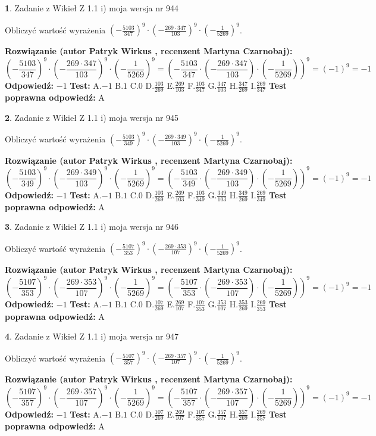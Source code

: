 \documentclass[12pt, a4paper]{article}
\theoremstyle{definition} %
\newtheorem{zad}{}
\newcommand{\zadStart}[1]{\begin{zad}#1\newline}
\newcommand{\zadStop}{\end{zad}}
\newcommand{\rozwStart}[2]{\noindent \textbf{Rozwiązanie (autor #1 , recenzent #2): }\newline}
\newcommand{\rozwStop}{\newline}
\newcommand{\odpStart}{\noindent \textbf{Odpowiedź:}\newline}
\newcommand{\odpStop}{\newline}
\newcommand{\testStart}{\noindent \textbf{Test:}\newline}
\newcommand{\testStop}{\newline}
\newcommand{\kluczStart}{\noindent \textbf{Test poprawna odpowiedź:}\newline}
\newcommand{\kluczStop}{\newline}
\begin{document}
\zadStart{Zadanie z Wikieł Z 1.1 i) moja wersja nr 944}

Obliczyć wartość wyrażenia $(-\frac{5103}{347})^{9} \cdot (-\frac{269 \cdot 347}{103})^{9} \cdot (-\frac{1}{5269})^{9}$.
\zadStop
\rozwStart{Patryk Wirkus}{Martyna Czarnobaj}
$$(-\frac{5103}{347})^{9} \cdot (-\frac{269 \cdot 347}{103})^{9} \cdot (-\frac{1}{5269})^{9} = (-\frac{5103}{347} \cdot (-\frac{269 \cdot 347}{103}) \cdot (-\frac{1}{5269}))^{9} = (-1)^{9} = -1$$
\rozwStop
\odpStart
$-1$
\odpStop
\testStart
A.$-1$ B.$1$ C.$0$ D.$\frac{103}{269}$ E.$\frac{269}{103}$
F.$\frac{103}{347}$ G.$\frac{347}{103}$
H.$\frac{347}{269}$
I.$\frac{269}{347}$
\testStop
\kluczStart
A
\kluczStop



\zadStart{Zadanie z Wikieł Z 1.1 i) moja wersja nr 945}

Obliczyć wartość wyrażenia $(-\frac{5103}{349})^{9} \cdot (-\frac{269 \cdot 349}{103})^{9} \cdot (-\frac{1}{5269})^{9}$.
\zadStop
\rozwStart{Patryk Wirkus}{Martyna Czarnobaj}
$$(-\frac{5103}{349})^{9} \cdot (-\frac{269 \cdot 349}{103})^{9} \cdot (-\frac{1}{5269})^{9} = (-\frac{5103}{349} \cdot (-\frac{269 \cdot 349}{103}) \cdot (-\frac{1}{5269}))^{9} = (-1)^{9} = -1$$
\rozwStop
\odpStart
$-1$
\odpStop
\testStart
A.$-1$ B.$1$ C.$0$ D.$\frac{103}{269}$ E.$\frac{269}{103}$
F.$\frac{103}{349}$ G.$\frac{349}{103}$
H.$\frac{349}{269}$
I.$\frac{269}{349}$
\testStop
\kluczStart
A
\kluczStop



\zadStart{Zadanie z Wikieł Z 1.1 i) moja wersja nr 946}

Obliczyć wartość wyrażenia $(-\frac{5107}{353})^{9} \cdot (-\frac{269 \cdot 353}{107})^{9} \cdot (-\frac{1}{5269})^{9}$.
\zadStop
\rozwStart{Patryk Wirkus}{Martyna Czarnobaj}
$$(-\frac{5107}{353})^{9} \cdot (-\frac{269 \cdot 353}{107})^{9} \cdot (-\frac{1}{5269})^{9} = (-\frac{5107}{353} \cdot (-\frac{269 \cdot 353}{107}) \cdot (-\frac{1}{5269}))^{9} = (-1)^{9} = -1$$
\rozwStop
\odpStart
$-1$
\odpStop
\testStart
A.$-1$ B.$1$ C.$0$ D.$\frac{107}{269}$ E.$\frac{269}{107}$
F.$\frac{107}{353}$ G.$\frac{353}{107}$
H.$\frac{353}{269}$
I.$\frac{269}{353}$
\testStop
\kluczStart
A
\kluczStop



\zadStart{Zadanie z Wikieł Z 1.1 i) moja wersja nr 947}

Obliczyć wartość wyrażenia $(-\frac{5107}{357})^{9} \cdot (-\frac{269 \cdot 357}{107})^{9} \cdot (-\frac{1}{5269})^{9}$.
\zadStop
\rozwStart{Patryk Wirkus}{Martyna Czarnobaj}
$$(-\frac{5107}{357})^{9} \cdot (-\frac{269 \cdot 357}{107})^{9} \cdot (-\frac{1}{5269})^{9} = (-\frac{5107}{357} \cdot (-\frac{269 \cdot 357}{107}) \cdot (-\frac{1}{5269}))^{9} = (-1)^{9} = -1$$
\rozwStop
\odpStart
$-1$
\odpStop
\testStart
A.$-1$ B.$1$ C.$0$ D.$\frac{107}{269}$ E.$\frac{269}{107}$
F.$\frac{107}{357}$ G.$\frac{357}{107}$
H.$\frac{357}{269}$
I.$\frac{269}{357}$
\testStop
\kluczStart
A
\kluczStop
\end{document}
